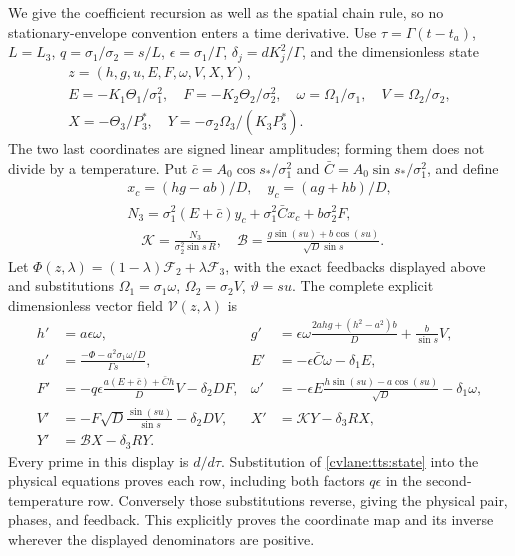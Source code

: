 We give the coefficient recursion as well as the spatial chain rule,
so no stationary-envelope convention enters a time derivative.
Use $\tau=\Gamma(t-t_a)$, $L=L_3$,
$q=\sigma_1/\sigma_2=s/L$, $\epsilon=\sigma_1/\Gamma$,
$\delta_j=dK_j^2/\Gamma$, and the dimensionless state
\begin{equation}\label{cvlane:tts:state}
 \begin{gathered}
 z=(h,g,u,E,F,\omega,V,X,Y),\\
 E=-K_1\Theta_1/\sigma_1^2,\quad
 F=-K_2\Theta_2/\sigma_2^2,\quad
 \omega=\Omega_1/\sigma_1,\quad V=\Omega_2/\sigma_2,\\
 X=-\Theta_3/P_3^*,\quad Y=-\sigma_2\Omega_3/(K_3P_3^*).
 \end{gathered}
\end{equation}
The two last coordinates are signed linear amplitudes; forming them
does not divide by a temperature. Put
$\bar c=A_0\cos s_*/\sigma_1^2$ and
$\bar C=A_0\sin s_*/\sigma_1^2$, and define
\[
 \begin{gathered}
 x_c=(hg-ab)/D,\quad y_c=(ag+hb)/D,\\
 N_3=\sigma_1^2(E+\bar c)y_c+\sigma_1^2\bar Cx_c
                                      +b\sigma_2^2F,\\
 \quad\mathcal K=\frac{N_3}{\sigma_2^2\sin s\,R},
 \quad\mathcal B=\frac{g\sin(su)+b\cos(su)}{\sqrt D\sin s}.
 \end{gathered}
\]
Let $\Phi(z,\lambda)=(1-\lambda)\mathcal F_2+
\lambda\mathcal F_3$, with the exact feedbacks displayed above
and substitutions $\Omega_1=\sigma_1\omega$,
$\Omega_2=\sigma_2V$, $\vartheta=su$. The complete explicit
dimensionless vector field $\mathcal V(z,\lambda)$ is
\begin{align}\label{cvlane:tts:vectorfield}
 h'&=a\epsilon\omega,&
 g'&=\epsilon\omega\frac{2ahg+(h^2-a^2)b}{D}
                                  +\frac b{\sin s}V,\nonumber\\
 u'&=\frac{-\Phi-a^2\sigma_1\omega/D}{\Gamma s},&
 E'&=-\epsilon\bar C\omega-\delta_1E,\nonumber\\
 F'&=-q\epsilon\frac{a(E+\bar c)+\bar Ch}{D}V-\delta_2DF,&
 \omega'&=-\epsilon E\frac{h\sin(su)-a\cos(su)}{\sqrt D}
                                               -\delta_1\omega,\\
 V'&=-F\sqrt D\frac{\sin(su)}{\sin s}-\delta_2DV,&
 X'&=\mathcal K Y-\delta_3RX,\nonumber\\
 Y'&=\mathcal B X-\delta_3RY.&&\nonumber
\end{align}
Every prime in this display is $d/d\tau$. Substitution of
\eqref{cvlane:tts:state} into the physical equations proves each row,
including both factors $q\epsilon$ in the second-temperature row.
Conversely those substitutions reverse, giving the physical pair,
phases, and feedback. This explicitly proves the coordinate map and
its inverse wherever the displayed denominators are positive.

